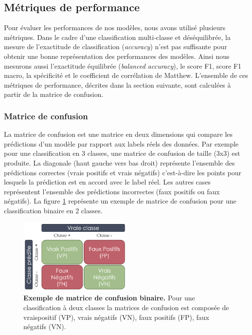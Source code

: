\subsection{Métriques de performance}
Pour évaluer les performances de nos modèles, nous avons utilisé plusieurs métriques. Dans le cadre d'une classification multi-classe et déséquilibrée, la mesure de l'exactitude de classification (\textit{accuracy}) n'est pas suffisante pour obtenir une bonne représentation des performances des modèles. Ainsi nous mesurons aussi l'exactitude équilibrée (\textit{balanced accuracy}), le score F1, score F1 macro, la spécificité et le coefficient de corrélation de Matthew. L'ensemble de ces métriques de performance, décrites dans la section suivante, sont calculées à partir de la matrice de confusion.

\subsubsection{Matrice de confusion}
La matrice de confusion est une matrice en deux dimensions qui compare les prédictions d'un modèle par rapport aux labels réels des données. Par exemple pour une classification en 3 classes, une matrice de confusion de taille (3x3) est produite. La diagonale (haut gauche vers bas droit) représente l'ensemble des prédictions correctes (vrais positifs et vrais négatifs) c'est-à-dire les points pour lesquels la prédiction est en accord avec le label réel. Les autres cases représentent l'ensemble des prédictions incorrectes (faux positifs ou faux négatifs). La figure \ref{fig:confusion-example} représente un exemple de matrice de confusion pour une classification binaire en 2 classes.
\begin{figure}[!htbp]
 \centering
 \includegraphics[width=0.5\textwidth]{figures/confusion_example.png}
 \caption[Exemple de matrice de confusion binaire]{\textbf{Exemple de matrice de confusion binaire.} Pour une classification à deux classes la matrices de confusion est composée de vraispositif (VP), vrais négatifs (VN), faux positifs (FP), faux négatifs (VN).}
 \label{fig:confusion-example}
\end{figure}

